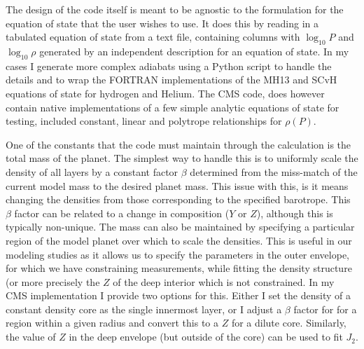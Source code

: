 The design of the code itself is meant to be agnostic to the formulation for the
equation of state that the user wishes to use. It does this by reading in a tabulated
equation of state from a text file, containing columns with $\log_{10}P$ and
$\log_{10}\rho$ generated by an independent description for an equation of state.
In my cases I generate more complex adiabats using a Python script to handle the
details and to wrap the FORTRAN implementations of the MH13 and SCvH equations of
state for hydrogen and Helium. The CMS code, does however contain native
implementations of a few simple analytic equations of state for testing, included
constant, linear and polytrope relationships for $\rho(P)$.

One of the constants that the code must maintain through the calculation is the total
mass of the planet. The simplest way to handle this is to uniformly scale the density
of all layers by a constant factor $\beta$ determined from the miss-match of the
current model mass to the desired planet mass. This issue with this, is it means
changing the densities from those corresponding to the specified barotrope. This
$\beta$ factor can be related to a change in composition ($Y$ or $Z$), although this
is typically non-unique. The mass can also be maintained by specifying a particular
region of the model planet over which to scale the densities. This is useful in our
modeling studies as it allows us to specify the parameters in the outer envelope,
for which we have constraining measurements, while fitting the density structure (or
more precisely the $Z$ of the deep interior which is not constrained. In my CMS
implementation I provide two options for this. Either I set the density of a constant
density core as the single innermost layer, or I adjust a $\beta$ factor for for a
region within a given radius and convert this to a $Z$ for a dilute core. Similarly,
the value of $Z$ in the deep envelope (but outside of the core) can be used to fit
$J_2$. 

